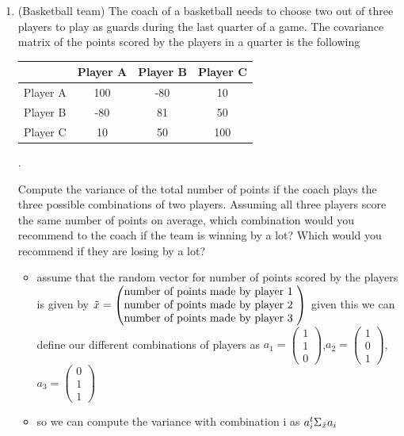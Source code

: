 \documentclass[12pt,twoside]{article}
\begin{document}
\begin{enumerate}
\begin{enumerate}
\end{enumerate}
\newpage
\item (Basketball team) The coach of a basketball needs to choose two out of three players to play as guards during the last quarter of a game. The covariance matrix of the points scored by the players in a quarter is the following
 \begin{center}
\begin{tabular}{ | c | c | c | c |  } %
  \hline			
&  Player A & Player B & Player C \\
  \hline			
Player A & 100 & -80 & 10   \\
  \hline  
Player B  & -80  & 81 & 50 \\ 
  \hline  
Player C &  10 & 50 & 100\\
 \hline  
 \end{tabular} .
\end{center}
Compute the variance of the total number of points if the coach plays the three possible combinations of two players. Assuming all three players score the same number of points on average, which combination would you recommend to the coach if the team is winning by a lot? Which would you recommend if they are losing by a lot? 
\begin{itemize}
  \color{blue}
  \item assume that the random vector for number of points scored by the players is given by $\Tilde{x}=\begin{pmatrix}
    \text{number of points made by player 1 }\\
    \text{number of points made by player 2 }\\
    \text{number of points made by player 3 }
  \end{pmatrix}$
  given this we can define our different combinations of players as $a_1=\begin{pmatrix} 1\\1\\0\end{pmatrix}$,$a_2=\begin{pmatrix} 1\\0\\1\end{pmatrix}$,$a_3=\begin{pmatrix} 0\\1\\1\end{pmatrix}$
\item so we can compute the variance with combination i as $a_{i}^t\Sigma_{\Tilde{x}}a_{i}$

\end{itemize}
\end{enumerate}
\end{document}
